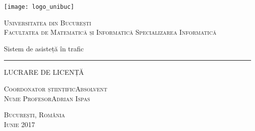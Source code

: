 \begin{titlepage}
	\begin{center}

		\texttt{[image: logo\_unibuc]}

		\vspace{0.5cm}
		\LARGE \textsc{Universitatea din București}
		\\
		\vspace{0.5cm}
		\Large \textsc{Facultatea de Matematică și Informatică}
		\vspace{0.5cm}
		\Large \textsc{Specializarea Informatică}

		\vfill

		\Huge Sistem de asisteță în trafic
		\rule{\textwidth}{1pt}
		\Large LUCRARE DE LICENȚĂ

		\vfill

		\Large
		\textsc{Coordonator științific}\hfill \textsc{Absolvent}
		\\
		\large
		\textsc{Nume Profesor}\hfill \textsc{Adrian Ispas}
	
		\vspace{1.5cm}
		\textsc{București, România}\\
		\textsc{Iunie 2017}

	\end{center}
\end{titlepage}
 
